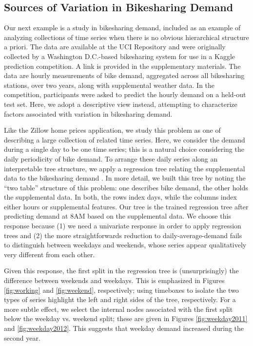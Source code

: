 \documentclass[12pt]{article}
\begin{document}
\subsection{Sources of Variation in Bikesharing
Demand}\label{bikesharing-study}

Our next example is a study in bikesharing demand, included as an example of
analyzing collections of time series when there is no obvious hierarchical
structure a priori. The data are available at the UCI Repository and were
originally collected by a Washington D.C.-based bikesharing system for use in a
Kaggle prediction competition. A link is provided in the supplementary
materials. The data are hourly measurements of bike demand, aggregated across
all bikesharing stations, over two years, along with supplemental weather data.
In the competition, participants were asked to predict the hourly demand on a
held-out test set. Here, we adopt a descriptive view instead, attempting to
characterize factors associated with variation in bikesharing demand.

Like the Zillow home prices application, we study this problem as one of
describing a large collection of related time series. Here, we consider
the demand during a single day to be one time series; this is a natural
choice considering the daily periodicity of bike demand. To arrange
these daily series along an interpretable tree structure, we apply a
regression tree relating the supplemental data to the bikesharing demand
\citep{breiman1984classification}. In more
detail, we built this tree by noting the ``two table'' structure of this
problem: one describes bike demand, the other holds the supplemental
data. In both, the rows index days, while the columns index either hours
or supplemental features. Our tree is the trained regression tree after
predicting demand at 8AM based on the supplemental data. We choose this
response because (1) we need a univariate response in order to apply
regression trees and (2) the more straightforwards reduction to
daily-average-demand fails to distinguish between weekdays and weekends,
whose series appear qualitatively very different from each other.

Given this response, the first split in the regression tree is
(unsurprisingly) the difference between weekends and weekdays. This is
emphasized in Figures \ref{fig:working} and \ref{fig:weekend}, respectively;
using timeboxes to isolate the two types of series highlight the left and right
sides of the tree, respectively. For a more subtle effect, we select the
internal nodes associated with the first split below the weekday vs. weekend
split; these are given in Figures \ref{fig:weekday2011} and
\ref{fig:weekday2012}. This suggests that weekday demand increased during the
second year.
\end{document}
